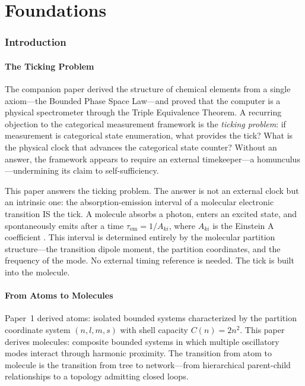 \documentclass[11pt,twocolumn,a4paper]{article}
\theoremstyle{definition}
\theoremstyle{remark}
\newcommand{\tem}{\tau_{\mathrm{em}}}
\newcommand{\Aki}{A_{ki}}
\begin{document}
\part{Foundations}

\section{Introduction}
\label{sec:introduction}

\subsection{The Ticking Problem}

The companion paper \citep{sachikonye2025a} derived the structure of chemical elements from a single axiom---the Bounded Phase Space Law---and proved that the computer is a physical spectrometer through the Triple Equivalence Theorem. A recurring objection to the categorical measurement framework is the \emph{ticking problem}: if measurement is categorical state enumeration, what provides the tick? What is the physical clock that advances the categorical state counter? Without an answer, the framework appears to require an external timekeeper---a homunculus---undermining its claim to self-sufficiency.

This paper answers the ticking problem. The answer is not an external clock but an intrinsic one: the absorption-emission interval of a molecular electronic transition IS the tick. A molecule absorbs a photon, enters an excited state, and spontaneously emits after a time $\tem = 1/\Aki$, where $\Aki$ is the Einstein A coefficient \citep{einstein1917}. This interval is determined entirely by the molecular partition structure---the transition dipole moment, the partition coordinates, and the frequency of the mode. No external timing reference is needed. The tick is built into the molecule.

\subsection{From Atoms to Molecules}

Paper~1 \citep{sachikonye2025a} derived atoms: isolated bounded systems characterized by the partition coordinate system $(n, l, m, s)$ with shell capacity $C(n) = 2n^2$. This paper derives molecules: composite bounded systems in which multiple oscillatory modes interact through harmonic proximity. The transition from atom to molecule is the transition from tree to network---from hierarchical parent-child relationships to a topology admitting closed loops.
\end{document}
